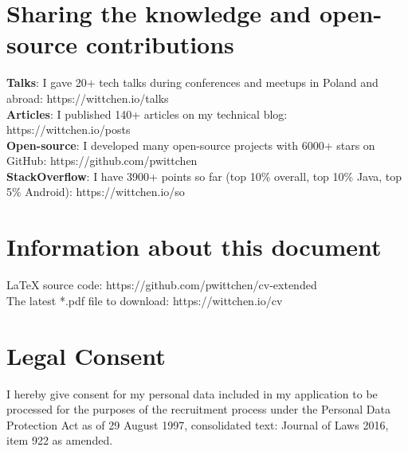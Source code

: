 \documentclass[letterpaper,11pt]{article}
\begin{document}
\section{Sharing the knowledge and open-source contributions}
 \begin{itemize}[leftmargin=0.15in, label={}]
    \small{\item{
     \textbf{Talks}{: I gave 20+ tech talks during conferences and meetups in Poland and abroad: https://wittchen.io/talks} \\
     \textbf{Articles}{: I published 140+ articles on my technical blog: https://wittchen.io/posts} \\
     \textbf{Open-source}{: I developed many open-source projects with 6000+ stars on GitHub: https://github.com/pwittchen} \\
     \textbf{StackOverflow}{: I have 3900+ points so far (top 10\% overall, top 10\% Java, top 5\% Android): https://wittchen.io/so}
    }}
 \end{itemize}

\section{Information about this document}
 \begin{itemize}[leftmargin=0.15in, label={}]
    \small{\item{
    {LaTeX source code: https://github.com/pwittchen/cv-extended} \\
    {The latest *.pdf file to download: https://wittchen.io/cv}
    }}
 \end{itemize}

\section{Legal Consent}
 \begin{itemize}[leftmargin=0.15in, label={}]
    \small{\item{
    I hereby give consent for my personal data included in my application
    to be processed for the purposes of the recruitment process
    under the Personal Data Protection Act as of 29 August 1997,
    consolidated text: Journal of Laws 2016, item 922 as amended. \\
    }}
 \end{itemize}

\end{document}
